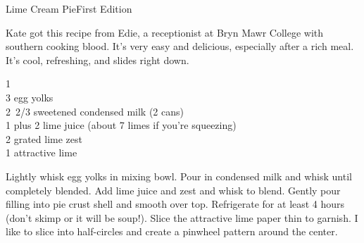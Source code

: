 \begin{entry}{Lime Cream Pie}{First Edition}

\begin{open}
  Kate got this recipe from Edie, a receptionist at Bryn Mawr College with
  southern cooking blood.  It's very easy and delicious, especially after a
  rich meal. It's cool, refreshing, and slides right down.
\end{open}
\begin{ingredients}
  1 \\
  3 egg yolks\\
  \SI{2/3}[2]{\cup} sweetened condensed milk (2 cans)\\
  \SI{1}{\cup} plus \SI{2}{\tblspoon} lime juice (about 7 limes if you're
  squeezing)\\
  \SI{2}{\teaspoon} grated lime zest\\
  1 attractive lime
\end{ingredients}
Lightly whisk egg yolks in mixing bowl. Pour in condensed milk and whisk until
completely blended.  Add lime juice and zest and whisk to blend. Gently pour
filling into pie crust shell and smooth over top.  Refrigerate for at least 4
hours (don't skimp or it will be soup!). Slice the attractive lime paper thin
to garnish. I like to slice into half-circles and create a pinwheel pattern
around the center.
\end{entry}